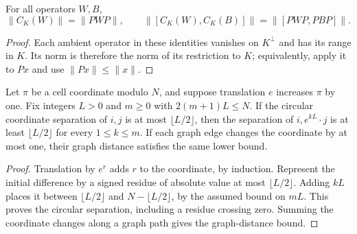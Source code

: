 \begin{lemma}
    \label{lem:hastings_ground_restriction_norm}
    \leanok
    For all operators $W,B$,
    \[
        \|C_K(W)\|=\|PWP\|,\qquad
        \|[C_K(W),C_K(B)]\|=\|[PWP,PBP]\|.
    \]
\end{lemma}
\begin{proof}\leanok
    Each ambient operator in these identities vanishes on $K^\perp$
    and has its range in $K$. Its norm is therefore the norm of its
    restriction to $K$; equivalently, apply it to $Px$ and use
    $\|Px\|\le\|x\|$.
\end{proof}

\begin{lemma}
    \label{lem:hastings_finite_translation_spacing}
    \leanok
    Let $\pi$ be a cell coordinate modulo $N$, and suppose translation
    $e$ increases $\pi$ by one. Fix integers $L>0$ and $m\ge0$ with
    $2(m+1)L\le N$. If the circular coordinate separation of $i,j$ is
    at most $\lfloor L/2\rfloor$, then the separation of
    $i,e^{kL}\cdot j$ is at least $\lfloor L/2\rfloor$ for every
    $1\le k\le m$. If each graph edge changes the coordinate by at
    most one, their graph distance satisfies the same lower bound.
\end{lemma}
\begin{proof}\leanok
    Translation by $e^r$ adds $r$ to the coordinate, by induction.
    Represent the initial difference by a signed residue of absolute
    value at most $\lfloor L/2\rfloor$. Adding $kL$ places it between
    $\lfloor L/2\rfloor$ and $N-\lfloor L/2\rfloor$, by the assumed
    bound on $mL$. This proves the circular separation, including a
    residue crossing zero. Summing the coordinate changes along a
    graph path gives the graph-distance bound.
\end{proof}


